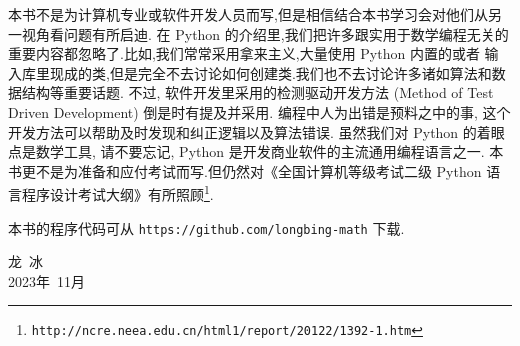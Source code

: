 本书不是为计算机专业或软件开发人员而写,但是相信结合本书学习会对他们从另一视角看问题有所启迪.
在 Python 的介绍里,我们把许多跟实用于数学编程无关的重要内容都忽略了.比如,我们常常采用拿来主义,大量使用 Python 内置的或者
输入库里现成的类,但是完全不去讨论如何创建类.我们也不去讨论许多诸如算法和数据结构等重要话题. 
不过, 软件开发里采用的检测驱动开发方法 (Method of Test Driven Development) 倒是时有提及并采用.
编程中人为出错是预料之中的事, 这个开发方法可以帮助及时发现和纠正逻辑以及算法错误.
虽然我们对 Python 的着眼点是数学工具,
请不要忘记, Python 是开发商业软件的主流通用编程语言之一.
本书更不是为准备和应付考试而写.但仍然对《全国计算机等级考试二级 Python 语 言程序设计考试大纲》有所照顾\footnote{\texttt{http://ncre.neea.edu.cn/html1/report/20122/1392-1.htm}}.

本书的程序代码可从 \verb|https://github.com/longbing-math| 下载.



{\kaishu
	\begin{center}
		\hspace*{88mm}龙\,   冰\\
		\hspace*{88mm}2023年~11月
	\end{center}
}


